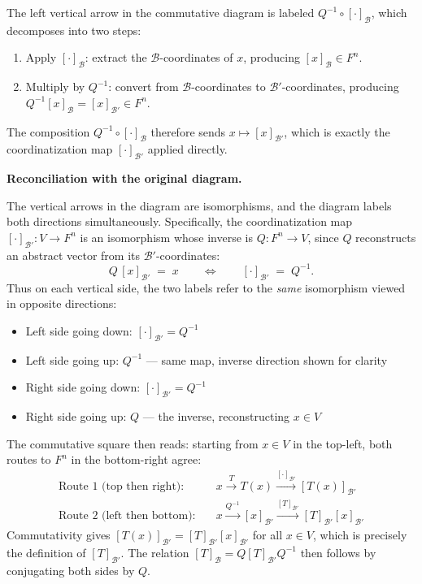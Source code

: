 \documentclass[12pt]{article}
\theoremstyle{remark}
\theoremstyle{definition}
\begin{document}
\medskip
The left vertical arrow in the commutative diagram is labeled
$Q^{-1} \circ [\cdot]_{\mathcal{B}}$, which decomposes into two steps:
\begin{enumerate}
    \item Apply $[\cdot]_{\mathcal{B}}$: extract the $\mathcal{B}$-coordinates
    of $x$, producing $[x]_{\mathcal{B}} \in F^n$.
    \item Multiply by $Q^{-1}$: convert from $\mathcal{B}$-coordinates to
    $\mathcal{B}'$-coordinates, producing $Q^{-1}[x]_{\mathcal{B}} = [x]_{\mathcal{B}'} \in F^n$.
\end{enumerate}
The composition $Q^{-1} \circ [\cdot]_{\mathcal{B}}$ therefore sends $x \mapsto [x]_{\mathcal{B}'}$,
which is exactly the coordinatization map $[\cdot]_{\mathcal{B}'}$ applied directly.


\noindent\textbf{Reconciliation with the original diagram.}

The vertical arrows in the diagram are isomorphisms, and the diagram
labels both directions simultaneously. Specifically, the
coordinatization map $[\cdot]_{\mathcal{B}'} : V \to F^n$ is an
isomorphism whose inverse is $Q : F^n \to V$, since $Q$ reconstructs
an abstract vector from its $\mathcal{B}'$-coordinates:
\[
    Q\,[x]_{\mathcal{B}'} \;=\; x
    \qquad \Longleftrightarrow \qquad
    [\cdot]_{\mathcal{B}'} \;=\; Q^{-1}.
\]
Thus on each vertical side, the two labels refer to the \emph{same}
isomorphism viewed in opposite directions:
\begin{itemize}
    \item Left side going down: $[\cdot]_{\mathcal{B}'} = Q^{-1}$
    \item Left side going up: $Q^{-1}$ --- same map, inverse direction shown for clarity
    \item Right side going down: $[\cdot]_{\mathcal{B}'} = Q^{-1}$
    \item Right side going up: $Q$ --- the inverse, reconstructing $x \in V$
\end{itemize}
The commutative square then reads: starting from $x \in V$ in the
top-left, both routes to $F^n$ in the bottom-right agree:
\begin{align*}
\text{Route 1 (top then right):} &\quad
    x \xrightarrow{T} T(x) \xrightarrow{[\cdot]_{\mathcal{B}'}} [T(x)]_{\mathcal{B}'} \\
\text{Route 2 (left then bottom):} &\quad
    x \xrightarrow{Q^{-1}} [x]_{\mathcal{B}'} \xrightarrow{[T]_{\mathcal{B}'}} [T]_{\mathcal{B}'}[x]_{\mathcal{B}'}
\end{align*}
Commutativity gives $[T(x)]_{\mathcal{B}'} = [T]_{\mathcal{B}'}[x]_{\mathcal{B}'}$
for all $x \in V$, which is precisely the definition of $[T]_{\mathcal{B}'}$.
The relation $[T]_{\mathcal{B}} = Q[T]_{\mathcal{B}'}Q^{-1}$ then follows
by conjugating both sides by $Q$.
\end{document}
